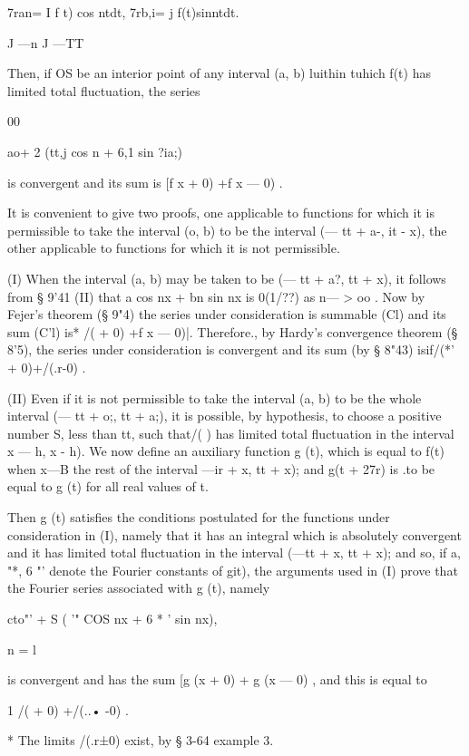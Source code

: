 7ran= I f t) cos ntdt, 7rb,i= j f(t)sinntdt. 

J —n J —TT 

Then, if OS be an interior point of any interval (a, b) luithin tuhich f(t) has 
limited total fluctuation, the series 

00 

 ao+ 2 (tt,j cos n  + 6,1 sin ?ia;) 

is convergent and its sum is   [f x + 0) +f x — 0) . 

It is convenient to give two proofs, one applicable to functions for which 
it is permissible to take the interval (o, b) to be the interval (— tt + a-, it -  x), 
the other applicable to functions for which it is not permissible. 

(I) When the interval (a, b) may be taken to be (— tt + a?, tt + x), it follows 
from § 9'41 (II) that a  cos nx + bn sin nx is 0(1/??) as n— > oo . Now by Fejer's 
theorem (§ 9"4) the series under consideration is summable (Cl) and its sum 
(C'l) is*    /(  + 0) +f x — 0)|. Therefore., by Hardy's convergence theorem 
(§ 8'5), the series under consideration is convergent and its sum (by § 8"43) 
isif/(*' + 0)+/(.r-0) . 

(II) Even if it is not permissible to take the interval (a, b) to be the 
whole interval (— tt + o;, tt + a;), it is possible, by hypothesis, to choose a 
positive number S, less than tt, such that/( ) has limited total fluctuation in 
the interval  x — h, x -  h). We now define an auxiliary function g (t), which 
is equal to f(t) when x—B%
the rest of the interval  —ir + x, tt + x); and g(t + 27r) is .to be equal to g (t) 
for all real values of t. 

Then g (t) satisfies the conditions postulated for the functions under 
consideration in (I), namely that it has an integral which is absolutely 
convergent and it has limited total fluctuation in the interval (—tt + x, tt + x); 
and so, if a, "*, 6 "' denote the Fourier constants of git), the arguments used 
in (I) prove that the Fourier series associated with g (t), namely 

  cto"' + S (  '" COS nx + 6 * ' sin nx), 

n = l 

is convergent and has the sum   [g (x + 0) + g (x — 0) , and this is equal to 

1  /(  + 0) +/(..• -0) . 

* The limits /(.r±0) exist, by § 3-64 example 3. 



